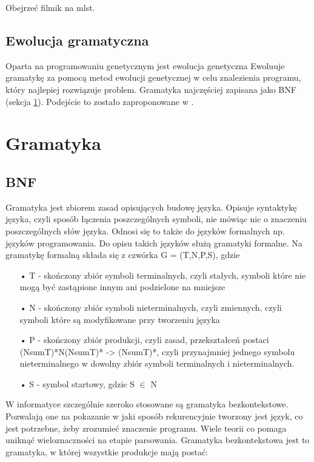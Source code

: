 Obejrzeć filmik na mlst.
\subsection{Ewolucja gramatyczna}
Oparta na programowaniu genetycznym jest ewolucja genetyczna 
Ewoluuje gramatykę za pomocą metod ewolucji genetycznej w celu znalezienia programu, który najlepiej rozwiązuje problem. Gramatyka najczęściej zapisana jako BNF (sekcja \ref{sec:gramatyka}). 
Podejście to zostało zaproponowane w \cite{ryan_collins_neill_1998}. 


\section{Gramatyka}
\label{sec:gramatyka}

\subsection{BNF}
\label{sec:BNF}
Gramatyka jest zbiorem zasad opisujących budowę języka. Opisuje syntaktykę języka, czyli sposób łączenia poszczególnych symboli, nie mówiąc nic o znaczeniu poszczególnych słów języka. Odnosi się to także do języków formalnych np. języków programowania. Do opisu takich języków służą gramatyki formalne. Na gramatykę formalną składa się z czwórka G = (T,N,P,S), gdzie 

\begin{itemize}
  \item[•] T - skończony zbiór symboli terminalnych, czyli stałych, symboli które nie mogą być zastąpione innym ani podzielone na mniejsze 
  \item[•] N - skończony zbiór symboli nieterminalnych, czyli zmiennych, czyli symboli które są modyfikowane przy tworzeniu języka
  \item[•] P - skończony zbiór produkcji, czyli zasad, przekształceń postaci (NsumT)*N(NsumT)* -> (NsumT)*, czyli przynajmniej jednego symbolu nieterminalnego w dowolny zbiór symboli terminalnych i nieterminalnych.
  \item[•] S - symbol startowy, gdzie S $\in$ N
\end{itemize}

W informatyce szczególnie szeroko stosowane są gramatyka bezkontekstowe. Pozwalają one na pokazanie w jaki sposób rekurencyjnie tworzony jest język, co jest potrzebne, żeby zrozumieć znaczenie programu. Wiele teorii co pomaga uniknąć wieloznaczności na etapie parsowania. 
Gramatyka bezkontekstowa jest to gramatyka, w której wszystkie produkcje mają postać:

